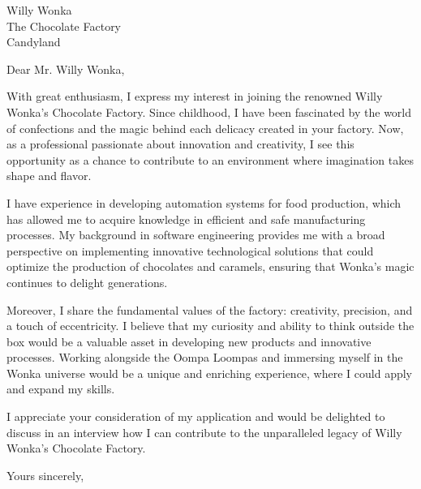 \documentclass[a4paper, 10pt]{letter}
\makeatletter
\renewcommand{\closing}[1]{\par\nobreak\vspace{\parskip}%
  \stopbreaks
  \noindent
  \ifx\@empty\fromaddress\else
  \hspace*{\longindentation}\fi
  \parbox{\indentedwidth}{\raggedright
       \ignorespaces #1\\[14\medskipamount]%
       \ifx\@empty\fromsig
           \fromname
       \else \fromsig \fi\strut}%
   \par}
\makeatother
\begin{document}
\begin{letter}{
    Willy Wonka\\
    The Chocolate Factory\\
    Candyland
}

\opening{Dear Mr. Willy Wonka,}

With great enthusiasm, I express my interest in joining the renowned Willy Wonka’s Chocolate Factory. Since childhood, I have been fascinated by the world of confections and the magic behind each delicacy created in your factory. Now, as a professional passionate about innovation and creativity, I see this opportunity as a chance to contribute to an environment where imagination takes shape and flavor.



I have experience in developing automation systems for food production, which has allowed me to acquire knowledge in efficient and safe manufacturing processes. My background in software engineering provides me with a broad perspective on implementing innovative technological solutions that could optimize the production of chocolates and caramels, ensuring that Wonka’s magic continues to delight generations.



Moreover, I share the fundamental values of the factory: creativity, precision, and a touch of eccentricity. I believe that my curiosity and ability to think outside the box would be a valuable asset in developing new products and innovative processes. Working alongside the Oompa Loompas and immersing myself in the Wonka universe would be a unique and enriching experience, where I could apply and expand my skills.



I appreciate your consideration of my application and would be delighted to discuss in an interview how I can contribute to the unparalleled legacy of Willy Wonka’s Chocolate Factory.

\closing{Yours sincerely,}

\end{letter}
\end{document}
